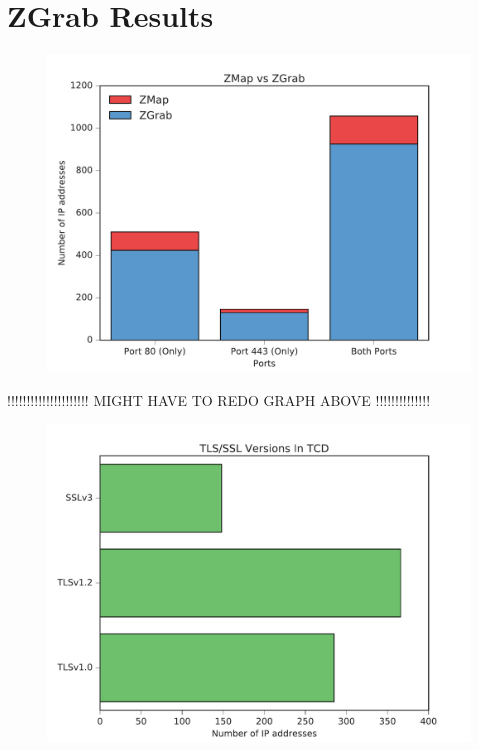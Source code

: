 \documentclass[a4wide,leqno,12pt]{report}
\begin{document}
\section{ZGrab Results} 
\begin{figure}[h!]
\includegraphics[scale=.5]{pdf_images/ZMapVsZGrab}
\end{figure}

!!!!!!!!!!!!!!!!!!!!! MIGHT HAVE TO REDO GRAPH ABOVE !!!!!!!!!!!!!!\\



\begin{figure}[h!]
\includegraphics[scale=.5]{pdf_images/TLSVersionsInTCD}
\end{figure}
\end{document}
